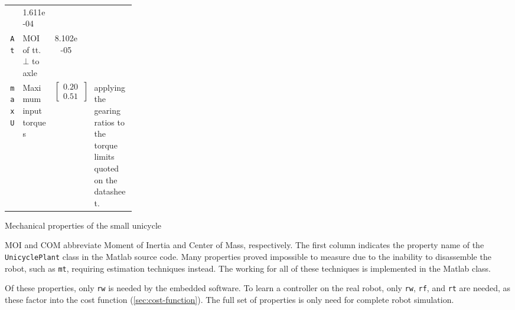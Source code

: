 {\begin{tabularx}{\linewidth}{
	@{}
	r
	>{\raggedright}p{0.25\linewidth}
	S[
		scientific-notation = engineering,
		table-format=-3e-1,
		table-auto-round
	]
	s
	X
	@{}
}
		& 1.611e-04 & \kilogram \square\meter
		&
	\\
	\texttt{At}
		& MOI of tt. $\bot$ to axle
		& 8.102e-05 & \kilogram \square\meter
		& 
	\\
\midrule
	\texttt{maxU}
		& Maximum input torques
		& {
			\renewcommand{\arraystretch}{1}
			$\begin{bmatrix}0.205 \\ 0.513\end{bmatrix}$
		} & \newton \meter
		& applying the gearing ratios\cite{gearbox} to the torque limits quoted on the datasheet\cite{motor}.
	\\
\bottomrule
\end{tabularx}
}

\centering
\caption{Mechanical properties of the small unicycle}
\medskip
\small
MOI and COM abbreviate Moment of Inertia and Center of Mass, respectively.
The first column indicates the property name of the \texttt{UnicyclePlant} class in the Matlab source code.
Many properties proved impossible to measure due to the inability to disassemble the robot, such as \texttt{mt}, requiring estimation techniques instead.
The working for all of these techniques is implemented in the Matlab  class.

\medskip
Of these properties, only \texttt{rw} is needed by the embedded software.
To learn a controller on the real robot, only \texttt{rw}, \texttt{rf}, and \texttt{rt} are needed, as these factor into the cost function (\cref{sec:cost-function}).
The full set of properties is only need for complete robot simulation.


